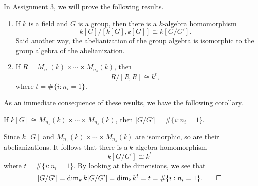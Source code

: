 In Assignment 3, we will prove the following results. 
\begin{enumerate}[(1)]
    \item If $k$ is a field and $G$ is a group, then there is a 
    $k$-algebra homomorphism 
    \[ k[G]/[k[G], k[G]] \cong k[G/G']. \] 
    Said another way, the abelianization of the group algebra is isomorphic 
    to the group algebra of the abelianization. 
    \item If $R = M_{n_1}(k) \times \cdots \times M_{n_s}(k)$, then 
    \[ R/[R, R] \cong k^t, \] 
    where $t = \#\{i : n_i = 1\}$. 
\end{enumerate}

As an immediate consequence of these results, we have the following 
corollary. 

\begin{cor}
    If $k[G] \cong M_{n_1}(k) \times \cdots \times M_{n_s}(k)$, then 
    $|G/G'| = \#\{i : n_i = 1\}$. 
\end{cor}
\begin{pf}
    Since $k[G]$ and $M_{n_1}(k) \times \cdots \times M_{n_s}(k)$ 
    are isomorphic, so are their abelianizations. It follows that there 
    is a $k$-algebra homomorphism 
    \[ k[G/G'] \cong k^t \] 
    where $t = \#\{i : n_i = 1\}$. By looking at the dimensions, we see that 
    \[ |G/G'| = \dim_k k[G/G'] = \dim_k k^t = t = \#\{i : n_i = 1\}. 
    \qedhere \] 
\end{pf}

